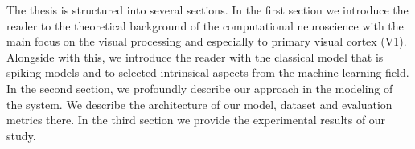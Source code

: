 The thesis is structured into several sections. In the first section
we introduce the reader to the theoretical background of the computational
neuroscience with the main focus on the visual processing and especially
to primary visual cortex (V1). Alongside with this, we introduce the reader
with the classical model that is spiking models and to selected intrinsical
aspects from the machine learning field. In the second section, we profoundly
describe our approach in the modeling of the system. We describe the architecture
of our model, dataset and evaluation metrics there. In the third section
we provide the experimental results of our study.


